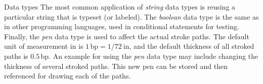\begin{section}{Data types}
The most common application of \textit{string} data types is reusing a particular string that is typeset (or labeled).  The \textit{boolean} data type is the same as in other programming languages, used in conditional statements for testing.  Finally, the \textit{pen} data type is used to affect the actual stroke paths.  The default unit of measurement in \MP{} is $1\,\mathrm{bp}=1/72\mathrm{\ in}$, and the default thickness of all stroked paths is $0.5\,\mathrm{bp}$.  An example for using the \textit{pen} data type may include changing the thickness of several stroked paths.  This new pen can be stored and then referenced for drawing each of the paths.
\end{section}
